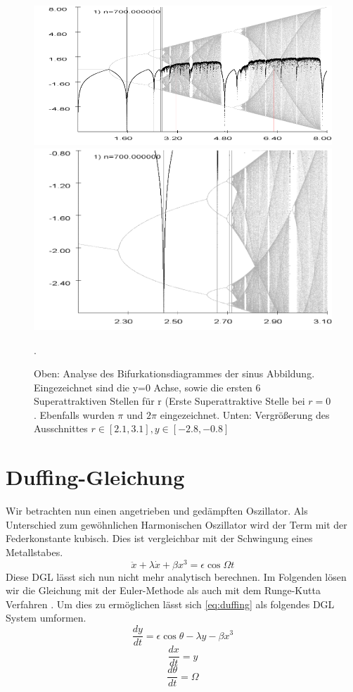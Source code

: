 \documentclass{scrartcl}
\begin{document}
\begin{figure}
\centering
\includegraphics[scale=0.55]{bifurkation-sin}
\includegraphics[scale=0.47]{bifurkation-sin-zoom}
\caption{Oben: Analyse des Bifurkationsdiagrammes der sinus Abbildung. Eingezeichnet sind die y=0 Achse, sowie die ersten 6 Superattraktiven Stellen für r (Erste Superattraktive Stelle bei $r=0$. Ebenfalls wurden $\pi$ und $2\pi$ eingezeichnet. Unten: Vergrößerung des Ausschnittes $r \in [2.1,3.1], y\in[-2.8,-0.8]$}. 
\label{fig:bifurc-sin}
\end{figure}
\newpage
\section { Duffing-Gleichung}
Wir betrachten nun einen angetrieben und gedämpften Oszillator. Als Unterschied zum gewöhnlichen Harmonischen Oszillator wird der Term mit der Federkonstante kubisch. Dies ist vergleichbar mit der Schwingung eines Metallstabes.
\begin{equation}
\ddot{x}+\lambda\dot{x}+\beta x^3=\epsilon\cos{\Omega t}
\label{eq:duffing}
\end{equation} 
Diese DGL lässt sich nun nicht mehr analytisch berechnen.
Im Folgenden lösen wir die Gleichung mit der Euler-Methode \parencite{wiki:euler} als auch mit dem Runge-Kutta Verfahren \parencite{wiki:runge}. Um dies zu ermöglichen lässt sich \eqref{eq:duffing} als folgendes DGL System umformen.
\begin{equation}\frac{dy}{dt}=\epsilon\cos{\theta}-\lambda y - \beta x^3\end{equation}
\begin{equation}\frac{dx}{dt}=y\end{equation}
\begin{equation}\frac{d\theta}{dt}=\Omega\end{equation}
\newline
\end{document}
